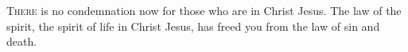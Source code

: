 
\lettrine{T}{here} is no condemnation now for those who are in Christ Jesus. The law of the spirit, the spirit of life in Christ Jesus, has freed you from the law of sin and death.